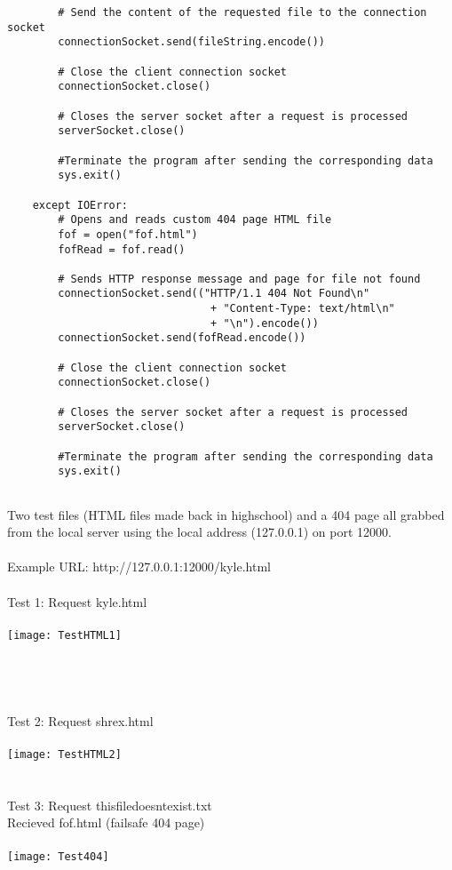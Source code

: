 \documentclass[12pt]{article}
\begin{document}
\begin{enumerate}
\begin{verbatim}
        # Send the content of the requested file to the connection socket
        connectionSocket.send(fileString.encode())

        # Close the client connection socket
        connectionSocket.close()

        # Closes the server socket after a request is processed
        serverSocket.close()

        #Terminate the program after sending the corresponding data
        sys.exit()

	except IOError:
        # Opens and reads custom 404 page HTML file
        fof = open("fof.html")
        fofRead = fof.read()

        # Sends HTTP response message and page for file not found
        connectionSocket.send(("HTTP/1.1 404 Not Found\n"
                                + "Content-Type: text/html\n"
                                + "\n").encode())
        connectionSocket.send(fofRead.encode())

        # Close the client connection socket
        connectionSocket.close()

        # Closes the server socket after a request is processed
        serverSocket.close()

        #Terminate the program after sending the corresponding data
        sys.exit()
		
		\end{verbatim}

		Two test files (HTML files made back in highschool) and a 404 page all grabbed from the local server using the local address (127.0.0.1) on port 12000.\\
		\\
		Example URL: http://127.0.0.1:12000/kyle.html\\
		\\
		Test 1: Request kyle.html\\
		\\
		\texttt{[image: TestHTML1]}\\
		\\
		\\
		\\
		\\
		Test 2: Request shrex.html\\
		\\
		\texttt{[image: TestHTML2]}\\
		\\
		\\
		Test 3: Request thisfiledoesntexist.txt\\
		Recieved fof.html (failsafe 404 page)\\
		\\
		\texttt{[image: Test404]}\\


\end{enumerate}
\end{document}
